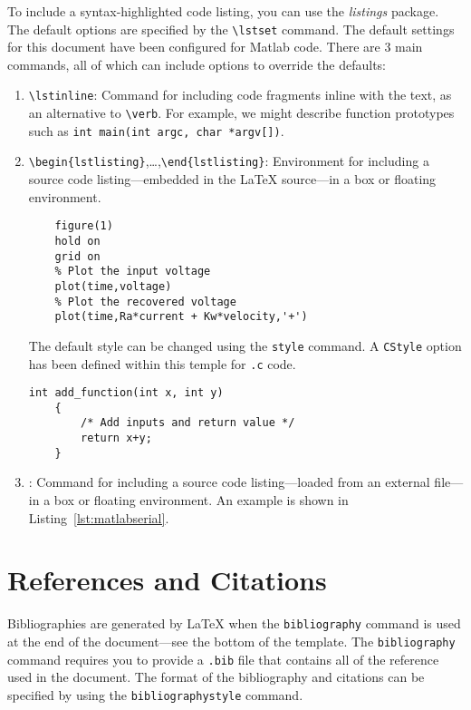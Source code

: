 \documentclass{UoNMCHA}
\numberwithin{equation}{section}
\begin{document}
To include a syntax-highlighted code listing, you can use the \emph{listings} package. The default options are specified by the \verb|\lstset| command. The default settings for this document have been configured for Matlab code. There are 3 main commands, all of which can include options to override the defaults:
\begin{enumerate}
    \item \verb|\lstinline|: Command for including code fragments inline with the text, as an alternative to \verb|\verb|. For example, we might describe function prototypes such as \lstinline[style=CStyle,breaklines=true]|int main(int argc, char *argv[])|.
    
    \item \verb|\begin{lstlisting}|,\ldots,\verb|\end{lstlisting}|: Environment for including a source code listing---embedded in the LaTeX source---in a box or floating environment.
	\begin{lstlisting}
	figure(1)
	hold on
	grid on
	% Plot the input voltage
	plot(time,voltage)
	% Plot the recovered voltage
	plot(time,Ra*current + Kw*velocity,'+')
	\end{lstlisting}
	
	The default style can be changed using the \texttt{style} command. A \texttt{CStyle} option has been defined within this temple for \texttt{.c} code.
	\begin{lstlisting}[style=CStyle]
	int add_function(int x, int y)
	{
	    /* Add inputs and return value */
	    return x+y;
	}
	\end{lstlisting}
	
    \item \verb||: Command for including a source code listing---loaded from an external file---in a box or floating environment. An example is shown in Listing~\ref{lst:matlabserial}.
\end{enumerate}


%

\newpage
\section{References and Citations}\label{sec:RefCite}
Bibliographies are generated by LaTeX when the \verb|bibliography| command is used at the end of the document---see the bottom of the template. The \verb|bibliography| command requires you to provide a \texttt{.bib} file that contains all of the reference used in the document. The format of the bibliography and citations can be specified by using the \verb|bibliographystyle| command.
\end{document}
